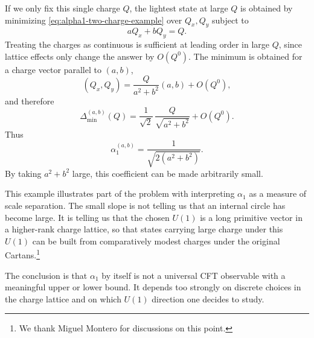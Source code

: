 \documentclass[a4paper,11pt]{article}
\begin{document}
\begin{itemize}
If we only fix this single charge $Q$, the lightest state at large $Q$ is obtained by minimizing \eqref{eq:alpha1-two-charge-example} over $Q_x,Q_y$ subject to
\begin{equation}
  aQ_x+bQ_y=Q.
\end{equation}
Treating the charges as continuous is sufficient at leading order in large $Q$, since lattice effects only change the answer by $O(Q^0)$. The minimum is obtained for a charge vector parallel to $(a,b)$,
\begin{equation}
  (Q_x,Q_y) = \frac{Q}{a^2+b^2}(a,b)+O(Q^0),
\end{equation}
and therefore
\begin{equation}
  \Delta_{\min}^{(a,b)}(Q) = \frac{1}{\sqrt2}\, \frac{Q}{\sqrt{a^2+b^2}} +O(Q^0).
\end{equation}
Thus
\begin{equation}
  \alpha_1^{(a,b)} = \frac{1}{\sqrt{2(a^2+b^2)}}.
\end{equation}
By taking $a^2+b^2$ large, this coefficient can be made arbitrarily small.

This example illustrates part of the problem with interpreting $\alpha_1$ as a measure of scale separation. The small slope is not telling us that an internal circle has become large. It is telling us that the chosen $U(1)$ is a long primitive vector in a higher-rank charge lattice, so that states carrying large charge under this $U(1)$ can be built from comparatively modest charges under the original Cartans.\footnote{We thank
Miguel Montero for discussions on this point.}
\end{itemize}

The conclusion is that $\alpha_1$ by itself is not a universal CFT observable with a meaningful upper or lower bound. It depends too strongly on discrete choices in the charge lattice and on which $U(1)$ direction one decides to study.
\end{document}
